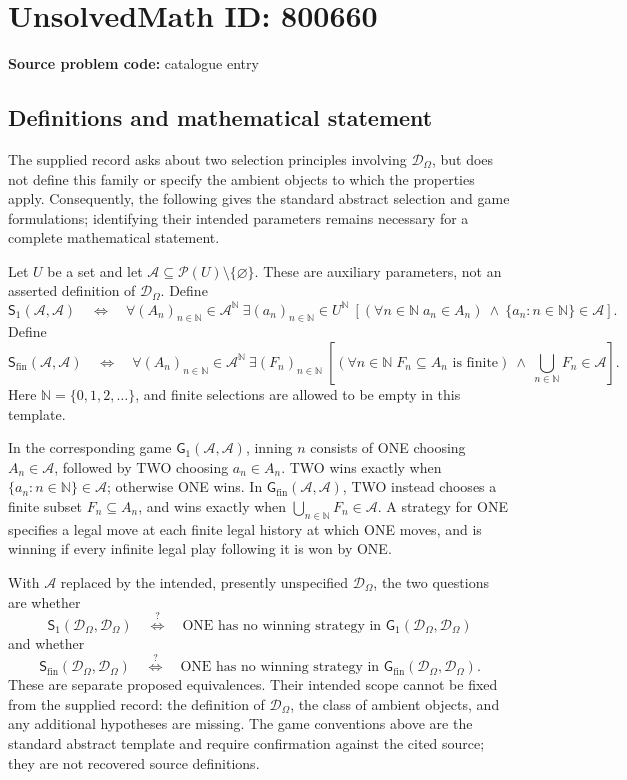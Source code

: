 \documentclass[11pt]{article}
\newcommand{\N}{\mathbb{N}}
\begin{document}
\section*{UnsolvedMath ID: 800660}
\textbf{Source problem code:} catalogue entry
\subsection{Definitions and mathematical statement}
The supplied record asks about two selection principles involving \(\mathcal D_\Omega\), but does not define this family or specify the ambient objects to which the properties apply. Consequently, the following gives the standard abstract selection and game formulations; identifying their intended parameters remains necessary for a complete mathematical statement.

Let \(U\) be a set and let \(\mathscr A\subseteq\mathcal P(U)\setminus\{\varnothing\}\). These are auxiliary parameters, not an asserted definition of \(\mathcal D_\Omega\). Define
\[
\mathsf S_1(\mathscr A,\mathscr A)
\quad\Longleftrightarrow\quad
\forall (A_n)_{n\in\N}\in\mathscr A^{\N}\ 
\exists (a_n)_{n\in\N}\in U^{\N}\ 
\left[(\forall n\in\N\;a_n\in A_n)\ \land\ \{a_n:n\in\N\}\in\mathscr A\right].
\]
Define
\[
\mathsf S_{\mathrm{fin}}(\mathscr A,\mathscr A)
\quad\Longleftrightarrow\quad
\forall (A_n)_{n\in\N}\in\mathscr A^{\N}\ 
\exists (F_n)_{n\in\N}\ 
\left[(\forall n\in\N\;F_n\subseteq A_n\text{ is finite})\ \land\ \bigcup_{n\in\N}F_n\in\mathscr A\right].
\]
Here \(\N=\{0,1,2,\ldots\}\), and finite selections are allowed to be empty in this template.

In the corresponding game \(\mathsf G_1(\mathscr A,\mathscr A)\), inning \(n\) consists of ONE choosing \(A_n\in\mathscr A\), followed by TWO choosing \(a_n\in A_n\). TWO wins exactly when \(\{a_n:n\in\N\}\in\mathscr A\); otherwise ONE wins. In \(\mathsf G_{\mathrm{fin}}(\mathscr A,\mathscr A)\), TWO instead chooses a finite subset \(F_n\subseteq A_n\), and wins exactly when \(\bigcup_{n\in\N}F_n\in\mathscr A\). A strategy for ONE specifies a legal move at each finite legal history at which ONE moves, and is winning if every infinite legal play following it is won by ONE.

With \(\mathscr A\) replaced by the intended, presently unspecified \(\mathcal D_\Omega\), the two questions are whether
\[
\mathsf S_1(\mathcal D_\Omega,\mathcal D_\Omega)
\quad\overset{?}{\Longleftrightarrow}\quad
\text{ONE has no winning strategy in }\mathsf G_1(\mathcal D_\Omega,\mathcal D_\Omega)
\]
and whether
\[
\mathsf S_{\mathrm{fin}}(\mathcal D_\Omega,\mathcal D_\Omega)
\quad\overset{?}{\Longleftrightarrow}\quad
\text{ONE has no winning strategy in }\mathsf G_{\mathrm{fin}}(\mathcal D_\Omega,\mathcal D_\Omega).
\]
These are separate proposed equivalences. Their intended scope cannot be fixed from the supplied record: the definition of \(\mathcal D_\Omega\), the class of ambient objects, and any additional hypotheses are missing. The game conventions above are the standard abstract template and require confirmation against the cited source; they are not recovered source definitions.
\end{document}
